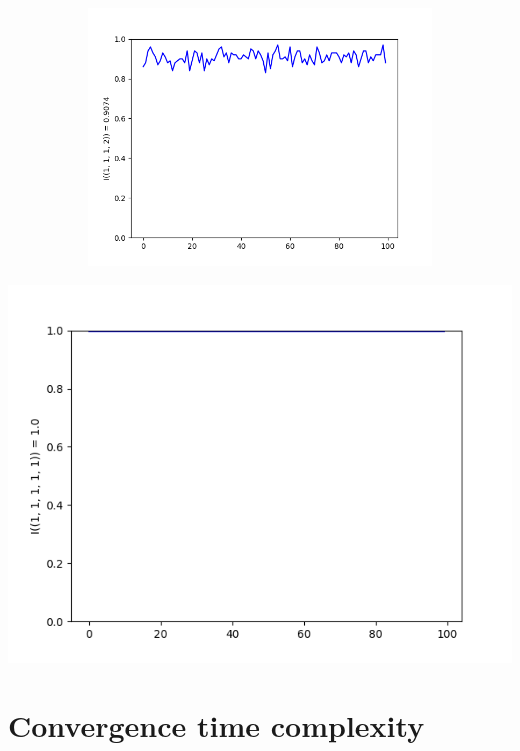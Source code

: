 \documentclass{llncs}
\begin{document}
\begin{figure}
\begin{subfigure}{0.5\linewidth}
\end{subfigure}
\begin{subfigure}{0.5\linewidth}
\centering\includegraphics[scale=0.4]{images/1-1-1-2-consistent-partitions-probability.png}
\end{subfigure}
\end{figure}

\newpage

\includegraphics[scale=0.4]{images/1-1-1-1-1-consistent-partitions-probability.png}

\section{Convergence time complexity}
\end{document}
